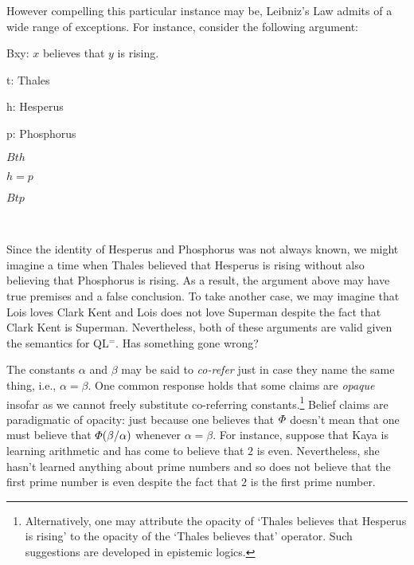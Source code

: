 However compelling this particular instance may be, Leibniz's Law admits of a wide range of exceptions.
For instance, consider the following argument:

\begin{multicols}{2}
  
\begin{ekey}
    \item[Bxy:] $x$ believes that $y$ is rising.
    \item[t:] Thales
    \item[h:] Hesperus
    \item[p:] Phosphorus
\end{ekey}

\begin{earg}
  \item[] $Bth$
  \item[] $h=p$
  \item[\therefore] $Btp$
  \item[] ~
\end{earg}

\end{multicols}

Since the identity of Hesperus and Phosphorus was not always known, we might imagine a time when Thales believed that Hesperus is rising without also believing that Phosphorus is rising.
As a result, the argument above may have true premises and a false conclusion.
To take another case, we may imagine that Lois loves Clark Kent and Lois does not love Superman despite the fact that Clark Kent is Superman.
Nevertheless, both of these arguments are valid given the semantics for QL$^=$.
Has something gone wrong?

The constants $\alpha$ and $\beta$ may be said to \textit{co-refer} just in case they name the same thing, i.e., $\alpha=\beta$.
One common response holds that some claims are \textit{opaque} insofar as we cannot freely substitute co-referring constants.\footnote{Alternatively, one may attribute the opacity of `Thales believes that Hesperus is rising' to the opacity of the `Thales believes that' operator. Such suggestions are developed in epistemic logics.}
Belief claims are paradigmatic of opacity: just because one believes that $\varPhi$ doesn't mean that one must believe that $\varPhi(\beta/\alpha)$ whenever $\alpha=\beta$.
For instance, suppose that Kaya is learning arithmetic and has come to believe that $2$ is even.
Nevertheless, she hasn't learned anything about prime numbers and so does not believe that the first prime number is even despite the fact that $2$ is the first prime number. 

